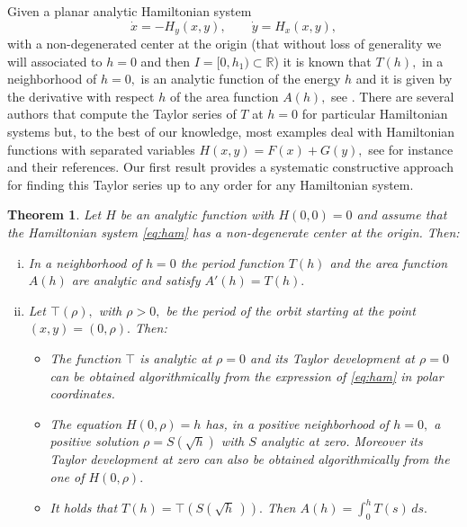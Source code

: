 \documentclass[12pt,a4paper,reqno]{amsart}
\newcommand{\R}{\mathbb{R}}
\newtheorem{teo}{Theorem}[section]
\begin{document}
Given a planar analytic Hamiltonian system
\begin{equation}\label{eq:ham}
\dot{x}= -H_y(x,y),\qquad \dot{y}=H_x(x,y),
\end{equation}
 with a non-degenerated
center at the origin (that without loss of generality we will
associated to $h=0$ and then $I=[0,h_1)\subset\R$)  it is known that
$T(h),$ in a neighborhood of $h=0,$ is an analytic function of the
energy $h$ and it is given by the derivative with respect $h$ of the
area function $A(h),$ see \cite{ManVil2002}. There are several
authors that compute the Taylor series of $T$  at $h=0$ for
particular Hamiltonian systems but, to the best of our knowledge,
most examples deal with Hamiltonian functions with separated
variables $H(x,y)=F(x)+G(y),$ see for instance
\cite{Bel2011,Fos2004} and their references. Our first result
provides a systematic constructive approach for finding this Taylor
series up to any order for any Hamiltonian system.


\begin{teo}\label{th:main1}
Let $ H $ be an analytic function with $ H (0,0) = 0 $ and assume
that the Hamiltonian
         system \eqref{eq:ham} has a non-degenerate center at the
         origin. Then:

         \begin{enumerate}[(i)]

         \item  In a neighborhood of $ h = 0 $ the period function $T(h)$ and the area function $A(h)$ are analytic
           and satisfy $A'(h) = T(h).$

          \item Let $\top(\rho),$ with $\rho>0,$ be the period of the orbit
          starting at the point $(x,y)=(0,\rho).$ Then:
\begin{itemize}
          \item The function  $\top$ is
          analytic at $\rho=0$ and its Taylor development  at $\rho=0$  can be
          obtained algorithmically from the expression of \eqref{eq:ham} in polar
          coordinates.
          \item  The equation $H(0,\rho)=h$ has, in a positive neighborhood of $h = 0,$  a
          positive solution $\rho= S(\sqrt{h})$ with $S$ analytic at
          zero. Moreover  its Taylor development at zero  can also be obtained algorithmically from the one of
          $H(0,\rho).$

          \item It holds that $T(h)= \top(S(\sqrt{h}\,)).$ Then
          $A(h)=\int_0^h T(s)\,ds.$

 \end{itemize}


 \end{enumerate}

\end{teo}
\end{document}
